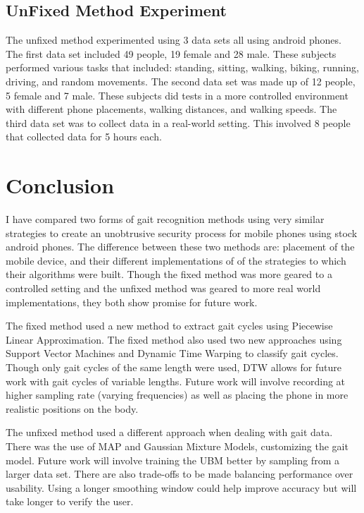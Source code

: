 \documentclass{sig-alternate}
\begin{document}
\subsection{UnFixed Method Experiment}
	The unfixed method experimented using 3 data sets all using android phones. The first data set included 49 people, 19 female and 28 male. These subjects performed various tasks that included: standing, sitting, walking, biking, running, driving, and random movements. The second data set was made up of 12 people, 5 female and 7 male. These subjects did tests in a more controlled environment with different phone placements, walking distances, and walking speeds. The third data set was to collect data in a real-world setting. This involved 8 people that collected data for 5 hours each.
	
\section{Conclusion}
	I have compared two forms of gait recognition methods using very similar strategies to create an unobtrusive security process for mobile phones using stock android phones. The difference between these two methods are: placement of the mobile device, and their different implementations of of the strategies to which their algorithms were built. Though the fixed method was more geared to a controlled setting and the unfixed method was geared to more real world implementations, they both show promise for future work. 
	
	The fixed method used a new method to extract gait cycles using Piecewise Linear Approximation. The fixed method also used two new approaches using Support Vector Machines and Dynamic Time Warping to classify gait cycles. Though only gait cycles of the same length were used, DTW allows for future work with gait cycles of variable lengths. Future work will involve recording at higher sampling rate (varying frequencies) as well as placing the phone in more realistic positions on the body.
		
		The unfixed method used a different approach when dealing with gait data. There was the use of MAP and Gaussian Mixture Models, customizing the gait model. Future work will involve training the UBM better by sampling from a larger data set. There are also trade-offs to be made balancing performance over usability. Using a longer smoothing window could help improve accuracy but will take longer to verify the user.
\end{document}
